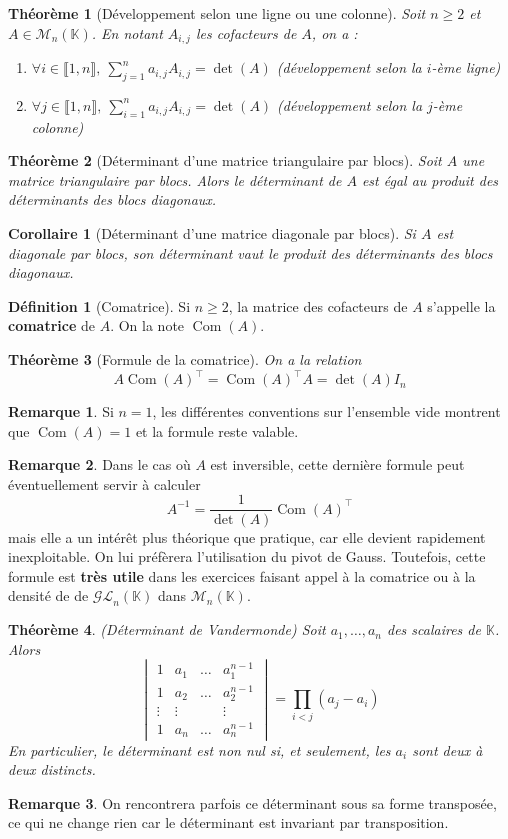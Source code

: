 \documentclass[french]{book}
\newcommand{\K}{\mathbb{K}}
\newcommand{\inv}{^{-1}}
\theoremstyle{plain}
\newtheorem{thm}{Théorème}[chapter]
\newtheorem{cor}{Corollaire}[chapter]
\theoremstyle{definition}
\newtheorem{dfn}{Définition}[chapter]
\newtheorem{rmq}{Remarque}[chapter]
\theoremstyle{remark}
\DeclareMathOperator{\com}{Com}
\begin{document}
\begin{thm}[Développement selon une ligne ou une colonne]
	Soit $n\geqslant2$ et $A\in\mathcal{M}_n(\K)$. En notant $A_{i,j}$ les cofacteurs de $A$, on a :
		\begin{enumerate}
			\item $\displaystyle\forall i\in\llbracket1,n\rrbracket,\ \sum_{j=1}^{n}a_{i,j}A_{i,j}=\det(A)$ (développement selon la $i$-ème ligne)
			\item $\displaystyle\forall j\in\llbracket1,n\rrbracket,\ \sum_{i=1}^{n}a_{i,j}A_{i,j}=\det(A)$ (développement selon la $j$-ème colonne)
		\end{enumerate}
\end{thm}
\begin{thm}[Déterminant d'une matrice triangulaire par blocs]
	Soit $A$ une matrice triangulaire par blocs. Alors le déterminant de $A$ est égal au produit des déterminants des blocs diagonaux.
\end{thm}
\begin{cor}[Déterminant d'une matrice diagonale par blocs]
	Si $A$ est diagonale par blocs, son déterminant vaut le produit des déterminants des blocs diagonaux.
\end{cor}
\begin{dfn}[Comatrice]
	Si $n\geqslant2$, la matrice des cofacteurs de $A$ s'appelle la \textbf{comatrice} de $A$. On la note $\com(A)$.
\end{dfn}
\begin{thm}[Formule de la comatrice]
	On a la relation $$A\com(A)^\top=\com(A)^\top A=\det(A)I_n$$
\end{thm}
\begin{rmq} Si $n=1$, les différentes conventions sur l'ensemble vide montrent que $\com(A)=1$ et la formule reste valable. \end{rmq}
\begin{rmq} Dans le cas où $A$ est inversible, cette dernière formule peut éventuellement servir à calculer $$A\inv=\frac{1}{\det(A)}\com(A)^\top $$ mais elle a un intérêt plus théorique que pratique, car elle devient rapidement inexploitable. On lui préfèrera l'utilisation du pivot de Gauss. Toutefois, cette formule est \textbf{très utile} dans les exercices faisant appel à la comatrice ou à la densité de de $\mathcal{GL}_n(\K)$ dans $\mathcal{M}_n(\K)$. \end{rmq}

\begin{thm}(Déterminant de Vandermonde)
	Soit $a_1,\ldots,a_n$ des scalaires de $\K$. Alors $$\begin{vmatrix}
		1&a_1&\ldots&a_1^{n-1}\\
		1&a_2&\ldots&a_2^{n-1}\\
		\vdots&\vdots&&\vdots \\
		1&a_n&\ldots&a_n^{n-1}
	\end{vmatrix} = \prod_{i<j}(a_j-a_i)$$
	En particulier, le déterminant est non nul si, et seulement, les $a_i$ sont deux à deux distincts.
\end{thm}
\begin{rmq} On rencontrera parfois ce déterminant sous sa forme transposée, ce qui ne change rien car le déterminant est invariant par transposition. \end{rmq}
\newpage
\end{document}
